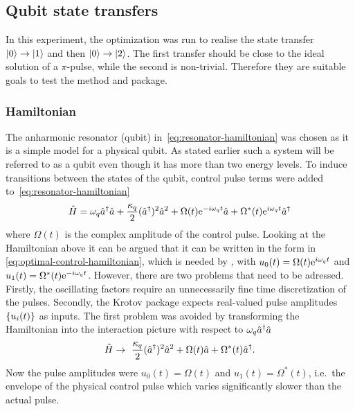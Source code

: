 \documentclass[main.tex]{subfiles}
\begin{document}
\subsection{Qubit state transfers}
In this experiment, the optimization was run to realise the state transfer \(\ket{0}\rightarrow\ket{1}\) and then \(\ket{0}\rightarrow\ket{2}\).
The first transfer should be close to the ideal solution of a \(\pi\)-pulse, while the second is non-trivial.
Therefore they are suitable goals to test the method and package.

\subsubsection{Hamiltonian}
The anharmonic resonator (qubit) in~\cref{eq:resonator-hamiltonian} was chosen as it is a simple model for a physical qubit.
As stated earlier such a system will be referred to as a qubit even though it has more than two energy levels.
To induce transitions between the states of the qubit, control pulse terms were added to~\cref{eq:resonator-hamiltonian}
\begin{equation}
    \hat{H} = \omega_{q} \hat{a}^\dagger\hat{a} + \frac{\kappa_q}{2} (\hat{a}^\dagger)^2\hat{a}^2 + \Omega(t)\mathrm{e}^{-i\omega_{q}t}\hat{a} + \Omega^*(t)\mathrm{e}^{i\omega_{q}t}\hat{a}^\dagger
    \label{eq:system-hamiltonian}
\end{equation}
where \( \Omega(t) \) is the complex amplitude of the control pulse.
Looking at the Hamiltonian above it can be argued that it can be written in the form in \cref{eq:optimal-control-hamiltonian}, which is needed by \krotov{}, with \( u_0(t) = \Omega(t)\mathrm{e}^{i\omega_{q}t} \) and \( u_1(t) = \Omega^*(t)\mathrm{e}^{-i\omega_{q}t} \).
However, there are two problems that need to be adressed.
Firstly, the oscillating factors require an unnecessarily fine time discretization of the pulses.
Secondly, the Krotov package expects real-valued pulse amplitudes \( \qty{u_i(t)} \) as inputs.
The first problem was avoided by transforming the Hamiltonian into the interaction picture with respect to \(\omega_{q} \hat{a}^\dagger\hat{a} \)
\begin{equation}
    \hat{H} \rightarrow~ \frac{\kappa_q}{2}(\hat{a}^\dagger)^2\hat{a}^2 + \Omega(t)\hat{a} + \Omega^*(t)\hat{a}^\dagger.
    \label{eq:krotov-hamiltonian-rotating}
\end{equation}
Now the pulse amplitudes were \( u_0(t) = \Omega(t) \) and \( u_1(t) = \Omega^*(t) \), i.e.\ the envelope of the physical control pulse which varies significantly slower than the actual pulse.
\end{document}
